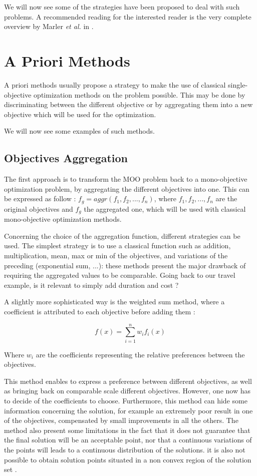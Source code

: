 We will now see some of the strategies have been proposed to deal with such problems. A recommended reading for the interested reader is the very complete overview by Marler \emph{et al.} in \cite{marler2004survey}. 

\section{A Priori Methods}

A priori methods usually propose a strategy to make the use of classical single-objective optimization methods on the problem possible. This may be done by discriminating between the different objective or by aggregating them into a new objective which will be used for the optimization.

We will now see some examples of such methods.

\subsection{Objectives Aggregation}

The first approach is to transform the MOO problem back to a mono-objective optimization problem, by aggregating the different objectives into one. This can be expressed as follow : \(f_g = aggr(f_1, f_2, ..., f_n)\), where \(f_1, f_2, ..., f_n\) are the original objectives and \(f_g\) the aggregated one, which will be used with classical mono-objective optimization methods.

Concerning the choice of the aggregation function, different strategies can be used. The simplest strategy is to use a classical function such as addition, multiplication, mean, max or min of the objectives, and variations of the preceding (exponential sum, ...): these methods present the major drawback of requiring the aggregated values to be comparable. Going back to our travel example, is it relevant to simply add duration and cost ?

A slightly more sophisticated way is the weighted sum method, where a coefficient is attributed to each objective before adding them \cite{Marler2010} :

\[ f(x) =\displaystyle\sum_{i=1}^n w_i f_i(x) \]

Where $w_i$ are the coefficients representing the relative preferences between the objectives.

This method enables to express a preference between different objectives, as well as bringing back on comparable scale different objectives. However, one now has to decide of the coefficients to choose. Furthermore, this method can hide some information concerning the solution, for example an extremely poor result in one of the objectives, compensated by small improvements in all the others. The method also present some limitations in the fact that it does not guarantee that the final solution will be an acceptable point, nor that a continuous variations of the points will leads to a continuous distribution of the solutions. it is also not possible to obtain solution points situated in a non convex region of the solution set \cite{marler2004survey}.

